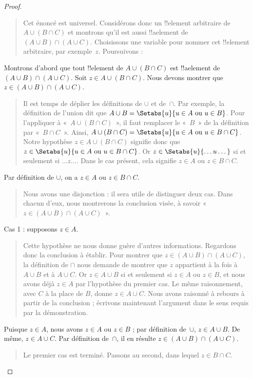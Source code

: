 \documentclass[../../../include/open-logic-section]{subfiles}
\begin{document}
\begin{proof}
\begin{quote}
Cet énoncé est universel. Considérons
donc un !!{element} arbitraire de
$A \cup (B \cap C)$ et montrons qu'il
est aussi !!a{element} de
$(A \cup B) \cap (A \cup C)$.
Choisissons une variable pour nommer
cet !!{element} arbitraire,
par exemple~$z$. Poursuivons :
\end{quote}
Montrons d'abord que tout !!{element} de
$A \cup (B \cap C)$ est
!!a{element} de
$(A \cup B) \cap (A \cup C)$.
Soit $z \in A \cup (B \cap C)$.
Nous devons montrer que
$z \in (A \cup B) \cap (A \cup C)$.
\begin{quote}
Il est temps de déplier les définitions
de $\cup$ et de~$\cap$. Par exemple,
la définition de l'union dit que
$A \cup B =
  \Setabs{u}{u \in A \text{ ou } u \in B}$.
Pour l'appliquer à «~$A \cup (B \cap C)$~»,
il faut remplacer le «~$B$~» de la
définition par «~$B \cap C$~». Ainsi,
$A \cup (B \cap C) =
  \Setabs{u}{u \in A \text{ ou } u \in B \cap C}$.
Notre hypothèse $z \in A \cup (B \cap C)$
signifie donc que
$z \in
  \Setabs{u}{u \in A \text{ ou } u \in B \cap C}$.
Or $z \in \Setabs{u}{\dots u\dots}$
si et seulement si $\dots z\dots$.
Dans le cas présent, cela signifie
$z \in A$ ou $z \in B \cap C$.
\end{quote}
Par définition de $\cup$, on a $z \in A$
ou $z \in B \cap C$.
\begin{quote}
Nous avons une disjonction : il sera
utile de distinguer deux cas.
Dans chacun d'eux, nous montrerons
la conclusion visée, à savoir
«~$z \in (A \cup B) \cap (A \cup C)$~».
\end{quote}
Cas 1 : supposons $z \in A$.
\begin{quote}
Cette hypothèse ne nous donne guère
d'autres informations. Regardons donc
la conclusion à établir. Pour montrer
que $z \in (A \cup B) \cap (A \cup C)$,
la définition de $\cap$ nous demande
de montrer que $z$ appartient à la
fois à $A \cup B$ et à $A \cup C$.
Or $z \in A \cup B$ si et seulement
si $z \in A$ ou $z \in B$, et nous
avons déjà $z \in A$ par l'hypothèse
du premier cas. Le même raisonnement,
avec $C$ à la place de $B$, donne
$z \in A \cup C$. Nous avons raisonné
à rebours à partir de la conclusion ;
écrivons maintenant l'argument dans
le sens requis par la démonstration.
\end{quote}
Puisque $z \in A$, nous avons
$z \in A$ ou $z \in B$ ; par
définition de~$\cup$, $z \in A \cup B$.
De même, $z \in A \cup C$. Par
définition de~$\cap$, il en résulte
$z \in (A \cup B) \cap (A \cup C)$.
\begin{quote}
Le premier cas est terminé. Passons
au second, dans lequel $z \in B \cap C$.

\end{quote}
\end{proof}
\end{document}
